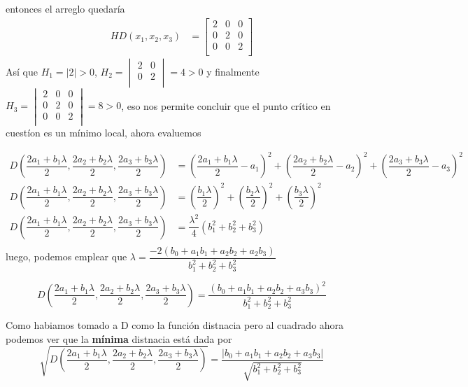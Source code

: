\documentclass[letterpaper]{article}
\providecommand{\abs}[1]{\left|#1\right|}
\renewcommand{\*}{\cdot}
\theoremstyle{definition}
\begin{document}
entonces el arreglo quedaría 
\begin{align*}
	HD(x_1,x_2,x_3) &= \begin{bmatrix}
	2 & 0 & 0\\
	0 & 2 & 0\\
	0 & 0 & 2\\
	\end{bmatrix}
\end{align*}
Así que $ H_1 = \abs{2} > 0 $, $ H_2 = \begin{vmatrix}
	2 & 0\\
	0 & 2\\
\end{vmatrix}  = 4 > 0$ y finalmente $ H_3 = \begin{vmatrix}
	2 & 0 & 0\\
	0 & 2 & 0\\
	0 & 0 & 2\\
\end{vmatrix} = 8 > 0$, eso nos permite concluir que el punto crítico en cuestíon es un mínimo local, ahora evaluemos

\begin{align*}
	D\left( \dfrac{2a_1 + b_1\lambda}{2}, \dfrac{2a_2 + b_2 \lambda}{2}, \dfrac{2a_3 + b_3 \lambda}{2} \right) &= \left( \dfrac{2a_1 + b_1\lambda}{2} - a_1 \right)^2 + \left( \dfrac{2a_2 + b_2 \lambda}{2} - a_2 \right)^2 + \left( \dfrac{2a_3 + b_3 \lambda}{2} - a_3 \right)^2\\
	D\left( \dfrac{2a_1 + b_1\lambda}{2}, \dfrac{2a_2 + b_2 \lambda}{2}, \dfrac{2a_3 + b_3 \lambda}{2} \right) &= \left( \dfrac{b_1\lambda}{2}  \right)^2 + \left( \dfrac{b_2 \lambda}{2} \right)^2 + \left( \dfrac{b_3 \lambda}{2}\right)^2\\
	D\left( \dfrac{2a_1 + b_1\lambda}{2}, \dfrac{2a_2 + b_2 \lambda}{2}, \dfrac{2a_3 + b_3 \lambda}{2} \right) &= \dfrac{\lambda^2}{4}\left( b_1^2 + b_2^2 + b_3^2 \right)\\
\end{align*}
luego, podemos emplear que $ \lambda = \dfrac{-2(b_0 + a_1b_1 +a_2 b_2 + a_2 b_3)}{b_1^2 + b_2^2 + b_3^2} $

\[ 	D\left( \dfrac{2a_1 + b_1\lambda}{2}, \dfrac{2a_2 + b_2 \lambda}{2}, \dfrac{2a_3 + b_3 \lambda}{2} \right) = \dfrac{(b_0 + a_1 b_1 + a_2 b_2 + a_3 b_3)^2}{b_1^2 + b_2^2 + b_3^2} \]
\begin{center}
	Como habiamos tomado a D como la función distnacia pero al cuadrado ahora podemos ver que la \textbf{mínima} distnacia está dada por
	\[ \sqrt{	D\left( \dfrac{2a_1 + b_1\lambda}{2}, \dfrac{2a_2 + b_2 \lambda}{2}, \dfrac{2a_3 + b_3 \lambda}{2} \right)} = \dfrac{|b_0 + a_1 b_1 + a_2 b_2 + a_3 b_3|}{\sqrt{b_1^2 + b_2^2 + b_3^2}}  \]
\end{center}
\end{document}
